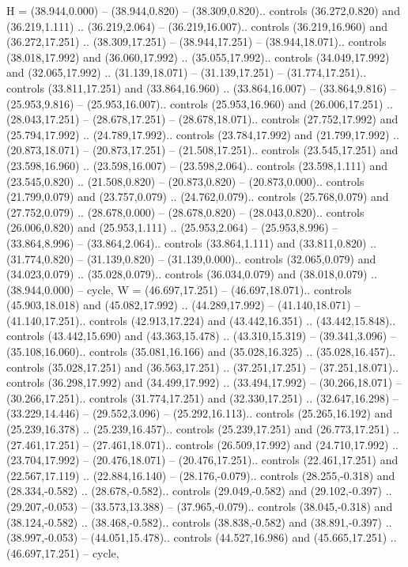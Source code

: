 {H} = {(38.944,0.000) -- (38.944,0.820) -- (38.309,0.820).. controls (36.272,0.820) and (36.219,1.111) .. (36.219,2.064) -- (36.219,16.007).. controls (36.219,16.960) and (36.272,17.251) .. (38.309,17.251) -- (38.944,17.251) -- (38.944,18.071).. controls (38.018,17.992) and (36.060,17.992) .. (35.055,17.992).. controls (34.049,17.992) and (32.065,17.992) .. (31.139,18.071) -- (31.139,17.251) -- (31.774,17.251).. controls (33.811,17.251) and (33.864,16.960) .. (33.864,16.007) -- (33.864,9.816) -- (25.953,9.816) -- (25.953,16.007).. controls (25.953,16.960) and (26.006,17.251) .. (28.043,17.251) -- (28.678,17.251) -- (28.678,18.071).. controls (27.752,17.992) and (25.794,17.992) .. (24.789,17.992).. controls (23.784,17.992) and (21.799,17.992) .. (20.873,18.071) -- (20.873,17.251) -- (21.508,17.251).. controls (23.545,17.251) and (23.598,16.960) .. (23.598,16.007) -- (23.598,2.064).. controls (23.598,1.111) and (23.545,0.820) .. (21.508,0.820) -- (20.873,0.820) -- (20.873,0.000).. controls (21.799,0.079) and (23.757,0.079) .. (24.762,0.079).. controls (25.768,0.079) and (27.752,0.079) .. (28.678,0.000) -- (28.678,0.820) -- (28.043,0.820).. controls (26.006,0.820) and (25.953,1.111) .. (25.953,2.064) -- (25.953,8.996) -- (33.864,8.996) -- (33.864,2.064).. controls (33.864,1.111) and (33.811,0.820) .. (31.774,0.820) -- (31.139,0.820) -- (31.139,0.000).. controls (32.065,0.079) and (34.023,0.079) .. (35.028,0.079).. controls (36.034,0.079) and (38.018,0.079) .. (38.944,0.000) -- cycle},
{W} = {(46.697,17.251) -- (46.697,18.071).. controls (45.903,18.018) and (45.082,17.992) .. (44.289,17.992) -- (41.140,18.071) -- (41.140,17.251).. controls (42.913,17.224) and (43.442,16.351) .. (43.442,15.848).. controls (43.442,15.690) and (43.363,15.478) .. (43.310,15.319) -- (39.341,3.096) -- (35.108,16.060).. controls (35.081,16.166) and (35.028,16.325) .. (35.028,16.457).. controls (35.028,17.251) and (36.563,17.251) .. (37.251,17.251) -- (37.251,18.071).. controls (36.298,17.992) and (34.499,17.992) .. (33.494,17.992) -- (30.266,18.071) -- (30.266,17.251).. controls (31.774,17.251) and (32.330,17.251) .. (32.647,16.298) -- (33.229,14.446) -- (29.552,3.096) -- (25.292,16.113).. controls (25.265,16.192) and (25.239,16.378) .. (25.239,16.457).. controls (25.239,17.251) and (26.773,17.251) .. (27.461,17.251) -- (27.461,18.071).. controls (26.509,17.992) and (24.710,17.992) .. (23.704,17.992) -- (20.476,18.071) -- (20.476,17.251).. controls (22.461,17.251) and (22.567,17.119) .. (22.884,16.140) -- (28.176,-0.079).. controls (28.255,-0.318) and (28.334,-0.582) .. (28.678,-0.582).. controls (29.049,-0.582) and (29.102,-0.397) .. (29.207,-0.053) -- (33.573,13.388) -- (37.965,-0.079).. controls (38.045,-0.318) and (38.124,-0.582) .. (38.468,-0.582).. controls (38.838,-0.582) and (38.891,-0.397) .. (38.997,-0.053) -- (44.051,15.478).. controls (44.527,16.986) and (45.665,17.251) .. (46.697,17.251) -- cycle},
